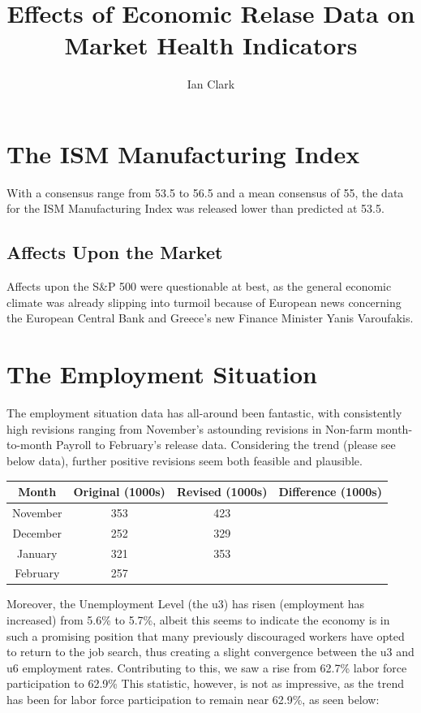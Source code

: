 \documentclass[11pt,letterpaper,english]{article}
\title{Effects of Economic Relase Data on Market Health Indicators}
\author{Ian Clark}
\date{}
\begin{document}
\maketitle

\section{The ISM Manufacturing Index}
With a consensus range from 53.5 to 56.5 and a mean consensus of 55, the data for the ISM Manufacturing Index was released lower than predicted at 53.5. 

\subsection{Affects Upon the Market}
Affects upon the S\&P 500 were questionable at best, as the general economic climate was already slipping into turmoil because of European news concerning the European Central Bank and Greece's new Finance Minister Yanis Varoufakis.

\section{The Employment Situation}
The employment situation data has all-around been fantastic, with consistently high revisions ranging from November's astounding revisions in Non-farm month-to-month Payroll to February's release data. Considering the trend (please see below data), further positive revisions seem both feasible and plausible.

\begin{center}
    \begin{tabular}{| c | c | c | c |}
    \hline
    Month       & Original (1000s) & Revised (1000s) & Difference (1000s) \\ \hline
    November    & 353 & 423 & \cellcolor{green}{+70} \\ \hline
    December    & 252 & 329 & \cellcolor{green}{+77} \\ \hline
    January     & 321 & 353 & \cellcolor{green}{+32} \\ \hline
    February    & 257 & \cellcolor{black}{} & \cellcolor{black}{} \\ \hline
    \end{tabular}
\end{center}

Moreover, the Unemployment Level (the u3) has risen (employment has increased) from 5.6\% to 5.7\%, albeit this seems to indicate the economy is in such a promising position that many previously discouraged workers have opted to return to the job search, thus creating a slight convergence between the u3 and u6 employment rates. 
Contributing to this, we saw a rise from 62.7\% labor force participation to 62.9\% This statistic, however, is not as impressive, as the trend has been for labor force participation to remain near 62.9\%, as seen below:
\end{document}
